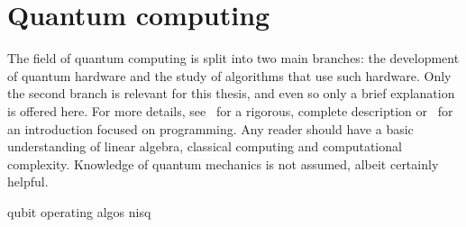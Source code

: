 \chapter{Quantum computing}
\label{chap:qc}
The field of quantum computing is split into two main branches: the development of quantum hardware and the study of algorithms that use such hardware.
Only the second branch is relevant for this thesis, and even so only a brief explanation is offered here.
For more details, see~\autocite{nielsen2012} for a rigorous, complete description or~\autocite{qiskit_textbook} for an introduction focused on programming.
Any reader should have a basic understanding of linear algebra, classical computing and computational complexity.
Knowledge of quantum mechanics is not assumed, albeit certainly helpful.

{qubit}
{operating}
{algos}
{nisq}





